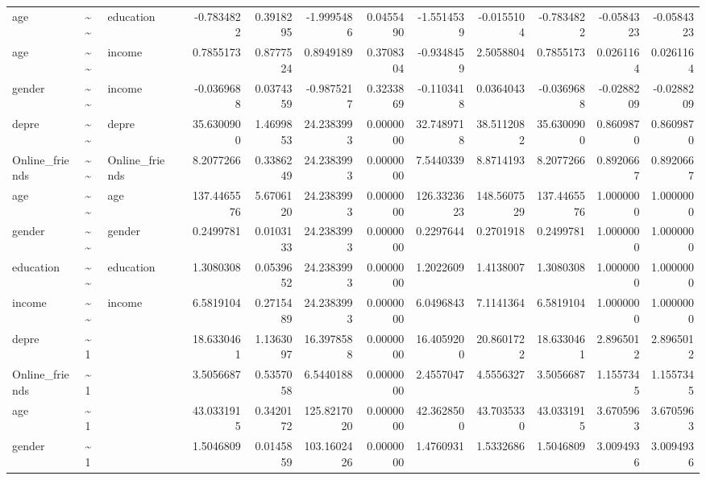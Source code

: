 \documentclass[
]{article}
\begin{document}
\begin{table}[!h]
\begin{tabular}[t]{llllrrrrrrrrr}
age & \textasciitilde{}\textasciitilde{} & education &  & -0.7834822 & 0.3918295 & -1.9995486 & 0.0455490 & -1.5514539 & -0.0155104 & -0.7834822 & -0.0584323 & -0.0584323\\
age & \textasciitilde{}\textasciitilde{} & income &  & 0.7855173 & 0.8777524 & 0.8949189 & 0.3708304 & -0.9348459 & 2.5058804 & 0.7855173 & 0.0261164 & 0.0261164\\
gender & \textasciitilde{}\textasciitilde{} & income &  & -0.0369688 & 0.0374359 & -0.9875217 & 0.3233869 & -0.1103418 & 0.0364043 & -0.0369688 & -0.0288209 & -0.0288209\\
\addlinespace
depre & \textasciitilde{}\textasciitilde{} & depre &  & 35.6300900 & 1.4699853 & 24.2383993 & 0.0000000 & 32.7489718 & 38.5112082 & 35.6300900 & 0.8609870 & 0.8609870\\
Online\_friends & \textasciitilde{}\textasciitilde{} & Online\_friends &  & 8.2077266 & 0.3386249 & 24.2383993 & 0.0000000 & 7.5440339 & 8.8714193 & 8.2077266 & 0.8920667 & 0.8920667\\
age & \textasciitilde{}\textasciitilde{} & age &  & 137.4465576 & 5.6706120 & 24.2383993 & 0.0000000 & 126.3323623 & 148.5607529 & 137.4465576 & 1.0000000 & 1.0000000\\
gender & \textasciitilde{}\textasciitilde{} & gender &  & 0.2499781 & 0.0103133 & 24.2383993 & 0.0000000 & 0.2297644 & 0.2701918 & 0.2499781 & 1.0000000 & 1.0000000\\
education & \textasciitilde{}\textasciitilde{} & education &  & 1.3080308 & 0.0539652 & 24.2383993 & 0.0000000 & 1.2022609 & 1.4138007 & 1.3080308 & 1.0000000 & 1.0000000\\
\addlinespace
income & \textasciitilde{}\textasciitilde{} & income &  & 6.5819104 & 0.2715489 & 24.2383993 & 0.0000000 & 6.0496843 & 7.1141364 & 6.5819104 & 1.0000000 & 1.0000000\\
depre & \textasciitilde{}1 &  &  & 18.6330461 & 1.1363097 & 16.3978588 & 0.0000000 & 16.4059200 & 20.8601722 & 18.6330461 & 2.8965012 & 2.8965012\\
Online\_friends & \textasciitilde{}1 &  &  & 3.5056687 & 0.5357058 & 6.5440188 & 0.0000000 & 2.4557047 & 4.5556327 & 3.5056687 & 1.1557345 & 1.1557345\\
age & \textasciitilde{}1 &  &  & 43.0331915 & 0.3420172 & 125.8217020 & 0.0000000 & 42.3628500 & 43.7035330 & 43.0331915 & 3.6705963 & 3.6705963\\
gender & \textasciitilde{}1 &  &  & 1.5046809 & 0.0145859 & 103.1602426 & 0.0000000 & 1.4760931 & 1.5332686 & 1.5046809 & 3.0094936 & 3.0094936\\

\end{tabular}
\end{table}
\end{document}
